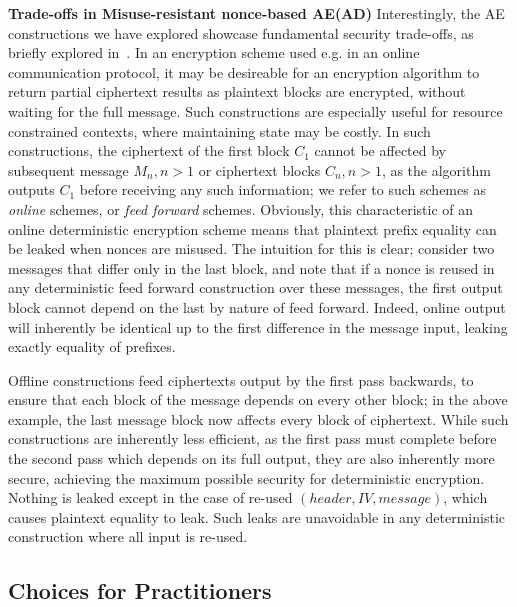 \textbf{Trade-offs in Misuse-resistant nonce-based AE(AD)} Interestingly, the AE constructions we have explored showcase fundamental security 
trade-offs, as briefly explored in~\cite{Rogaway2006}.  In an encryption scheme used e.g. in an online communication protocol, it may be desireable 
for an encryption algorithm to return partial ciphertext results as plaintext blocks are encrypted, without waiting for the full message.  Such 
constructions are especially useful for resource constrained contexts, where maintaining state may be costly.  In such constructions, the ciphertext 
of the first block $C_1$ cannot be affected by subsequent message $M_n, n>1$ or ciphertext blocks $C_n, n>1$, as the algorithm outputs $C_1$ before 
receiving any such information; we refer to such schemes as \emph{online} schemes, or \emph{feed forward} schemes.  Obviously, this characteristic of 
an online deterministic encryption scheme means that plaintext prefix equality can be leaked when nonces are misused.  The intuition for this is 
clear; consider two messages that differ only in the last block, and note that if a nonce is reused in any deterministic feed forward construction 
over these messages, the first output block cannot depend on the last by nature of feed forward.  Indeed, online output will inherently be identical 
up to the first difference in the message input, leaking exactly equality of prefixes.

Offline constructions feed ciphertexts output by the first pass backwards, to ensure that each block of the message depends on every other block; in 
the above example, the last message block now affects every block of ciphertext.  While such constructions are inherently less efficient, as the first 
pass must complete before the second pass which depends on its full output, they are also inherently more secure, achieving the maximum possible 
security for deterministic encryption.  Nothing is leaked except in the case of re-used $(header, IV, message)$, which causes plaintext equality to 
leak.  Such leaks are unavoidable in any deterministic construction where all input is re-used.

\subsection{Choices for Practitioners}

